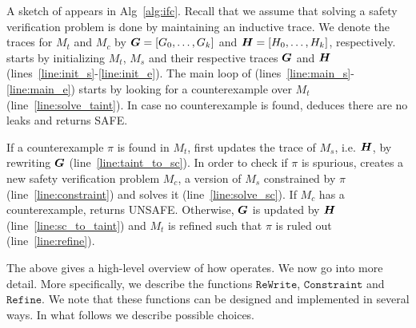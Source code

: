 A sketch of \Ifc appears in Alg~\ref{alg:ifc}. Recall that we assume that solving a safety verification problem is done by maintaining an inductive trace. We denote the traces for $M_t$ and $M_c$ by $\vG=[G_0,\ldots,G_k]$ and $\vH=[H_0,\ldots,H_k]$, respectively. \Ifc starts by initializing $M_t$, $M_s$  and their respective traces $\vG$ and $\vH$ (lines~\ref{line:init_s}-\ref{line:init_e}). The main loop of \Ifc (lines~\ref{line:main_s}-\ref{line:main_e}) starts by looking for a counterexample over $M_t$ (line~\ref{line:solve_taint}). In case no counterexample is found, \Ifc deduces there are no leaks and returns SAFE.

If a counterexample $\pi$ is found in $M_t$, \Ifc first updates the trace of $M_s$, i.e. $\vH$, by rewriting $\vG$ (line~\ref{line:taint_to_sc}). In order to check if $\pi$ is spurious, \Ifc creates a new safety verification problem $M_c$, a version of $M_s$ constrained by $\pi$ (line~\ref{line:constraint}) and solves it (line~\ref{line:solve_sc}). If $M_c$ has a counterexample, \Ifc returns UNSAFE. Otherwise, $\vG$ is updated by $\vH$ (line~\ref{line:sc_to_taint}) and $M_t$ is refined such that $\pi$ is ruled out (line~\ref{line:refine}).

The above gives a high-level overview of how \Ifc operates. We now go into more detail. 
More specifically, we describe the functions $\texttt{ReWrite}$, $\texttt{Constraint}$ 
and $\texttt{Refine}$. We note that these functions can be designed and implemented in several
ways. In what follows we describe possible choices.

